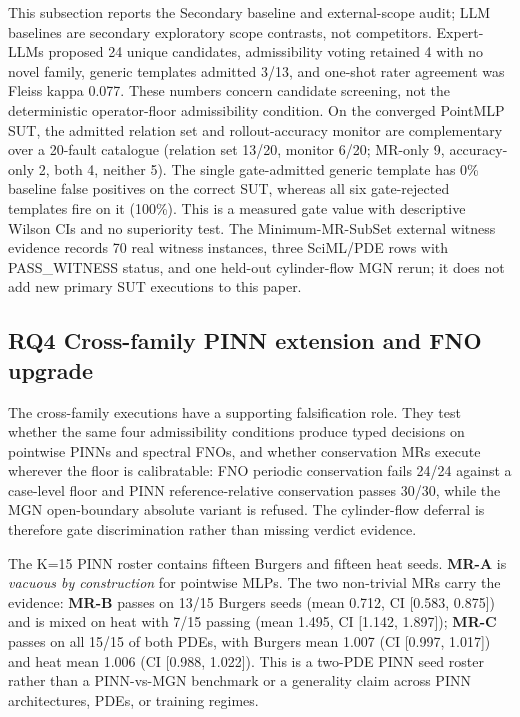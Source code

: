 This subsection reports the Secondary baseline and external-scope audit; LLM baselines are secondary exploratory scope contrasts, not competitors. Expert-LLMs proposed 24 unique candidates, admissibility voting retained 4 with no novel family, generic templates admitted 3/13, and one-shot rater agreement was Fleiss kappa 0.077. These numbers concern candidate screening, not the deterministic operator-floor admissibility condition. On the converged PointMLP SUT, the admitted relation set and rollout-accuracy monitor are complementary over a 20-fault catalogue (relation set 13/20, monitor 6/20; MR-only 9, accuracy-only 2, both 4, neither 5). The single gate-admitted generic template has 0\% baseline false positives on the correct SUT, whereas all six gate-rejected templates fire on it (100\%). This is a measured gate value with descriptive Wilson CIs and no superiority test. The Minimum-MR-SubSet external witness evidence records 70 real witness instances, three SciML/PDE rows with PASS\_WITNESS status, and one held-out cylinder-flow MGN rerun; it does not add new primary SUT executions to this paper.

\subsection{RQ4 Cross-family PINN extension and FNO upgrade}
\label{subsec:pinn-extension}

The cross-family executions have a supporting falsification role. They test whether the same four admissibility conditions produce typed decisions on pointwise PINNs and spectral FNOs, and whether conservation MRs execute wherever the floor is calibratable: FNO periodic conservation fails 24/24 against a case-level floor and PINN reference-relative conservation passes 30/30, while the MGN open-boundary absolute variant is refused. The cylinder-flow deferral is therefore gate discrimination rather than missing verdict evidence.

The K=15 PINN roster contains fifteen Burgers and fifteen heat seeds. \textbf{MR-A} is \emph{vacuous by construction} for pointwise MLPs. The two non-trivial MRs carry the evidence: \textbf{MR-B} passes on 13/15 Burgers seeds (mean 0.712, CI [0.583, 0.875]) and is mixed on heat with 7/15 passing (mean 1.495, CI [1.142, 1.897]); \textbf{MR-C} passes on all 15/15 of both PDEs, with Burgers mean 1.007 (CI [0.997, 1.017]) and heat mean 1.006 (CI [0.988, 1.022]). This is a two-PDE PINN seed roster rather than a PINN-vs-MGN benchmark or a generality claim across PINN architectures, PDEs, or training regimes.


